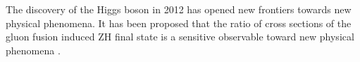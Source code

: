 \label{sec:introduction}

The discovery of the Higgs boson in 2012 has opened new frontiers towards new physical phenomena. It has been proposed that the ratio of cross sections of the gluon fusion induced ZH final state is a sensitive observable toward new physical phenomena \cite{Harlander_2018}.
